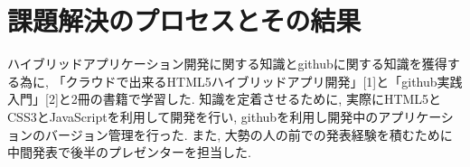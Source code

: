 \section{課題解決のプロセスとその結果}
ハイブリッドアプリケーション開発に関する知識とgithubに関する知識を獲得する為に,
「クラウドで出来るHTML5ハイブリッドアプリ開発」[1]と「github実践入門」[2]と2冊の書籍で学習した.
知識を定着させるために, 実際にHTML5とCSS3とJavaScriptを利用して開発を行い,
githubを利用し開発中のアプリケーションのバージョン管理を行った.
また, 大勢の人の前での発表経験を積むために中間発表で後半のプレゼンターを担当した.
